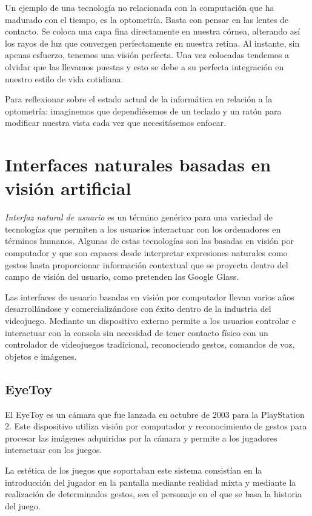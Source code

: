 Un ejemplo de una tecnología no relacionada con la computación que ha madurado con el tiempo, es la optometría. Basta con pensar en las lentes de contacto. Se coloca una capa fina directamente en nuestra córnea, alterando así los rayos de luz que convergen perfectamente en nuestra retina. Al instante, sin apenas esfuerzo, tenemos una visión perfecta. Una vez colocadas tendemos a olvidar que las llevamos puestas y esto se debe a su perfecta integración en nuestro estilo de vida cotidiana. 

Para reflexionar sobre el estado actual de la informática en relación a la optometría: imaginemos que dependiésemos de un teclado y un ratón para modificar nuestra vista cada vez que necesitásemos enfocar.

\section{Interfaces naturales basadas en visión artificial}
\emph{Interfaz natural de usuario} es un término genérico para una variedad de tecnologías que permiten a los usuarios interactuar con los ordenadores en términos humanos. Algunas de estas tecnologías son las basadas en visión por computador y que son capaces desde interpretar expresiones naturales como gestos hasta proporcionar información contextual que se proyecta dentro del campo de visión del usuario, como pretenden las Google Glass. 

Las interfaces de usuario basadas en visión por computador llevan varios años desarrollándose y comercializándose con éxito dentro de la industria del videojuego. Mediante un dispositivo externo permite a los usuarios controlar e interactuar con la consola sin necesidad de tener contacto físico con un controlador de videojuegos tradicional, reconociendo gestos, comandos de voz, objetos e imágenes.

\subsection{EyeToy}
El EyeToy es un cámara que fue lanzada en octubre de 2003 para la PlayStation 2. Este dispositivo utiliza visión por computador y reconocimiento de gestos para procesar las imágenes adquiridas por la cámara y permite a los jugadores interactuar con los juegos.

La estética de los juegos que soportaban este sistema consistían en la introducción del jugador en la pantalla mediante realidad mixta y mediante la realización de determinados gestos, sea el personaje en el que se basa la historia del juego. 

